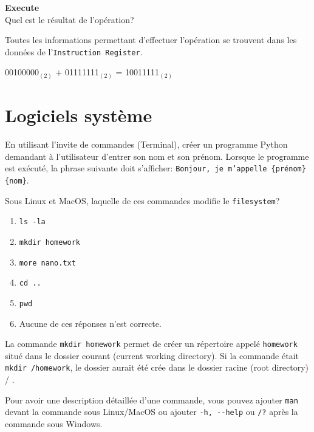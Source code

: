 \begin{Exercice}[5 minutes] \textbf{Execute}\\
    Quel est le résultat de l'opération?
\end{Exercice}

   \begin{conseil}
        Toutes les informations permettant d’effectuer l’opération se trouvent dans les données de l’\lstinline{Instruction Register}.
    \end{conseil}

\begin{solution}
    00100000$_{(2)}$ + 01111111$_{(2)}$ = 10011111$_{(2)}$
\end{solution}


\section{Logiciels système}

\begin{Exercice}[10 minutes]
    En utilisant l'invite de commandes (Terminal), créer un programme Python demandant à l'utilisateur d'entrer son nom et son prénom. Lorsque le programme est exécuté, la phrase suivante doit s'afficher: \texttt{Bonjour, je m'appelle \{prénom\} \{nom\}}.
\end{Exercice}

\begin{solution}
    
\end{solution}


\begin{Exercice}[5 minutes]
    Sous Linux et MacOS, laquelle de ces commandes modifie le \lstinline{filesystem}?
    \begin{enumerate}
        \item \lstinline{ls -la}
        \item \lstinline{mkdir homework}
        \item \lstinline{more nano.txt}
        \item \lstinline{cd ..}
        \item \lstinline{pwd}
        \item Aucune de ces réponses n'est correcte.
    \end{enumerate}
    \begin{solution}
        La commande \lstinline{mkdir homework} permet de créer un répertoire appelé \lstinline{homework} situé dans le dossier courant (current working directory).
        Si la commande était \lstinline{mkdir /homework}, le dossier aurait été crée dans le dossier racine (root directory) / .
    \end{solution}
    \begin{attention}
        Pour avoir une description détaillée d'une commande, vous pouvez ajouter \lstinline{man} devant la commande sous Linux/MacOS ou ajouter \lstinline{-h, --help} ou \lstinline{/?} après la commande sous Windows.
    \end{attention}
\end{Exercice}

